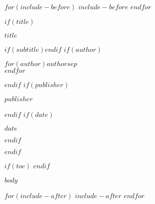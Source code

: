 \documentclass[
  $if(classoption)$$for(classoption)$$classoption$$sep$,$endfor$$else$oneside$endif$,
  $if(fontsize)$$fontsize$$else$11pt$endif$
]{scrbook}
\newcommand{\PrintTitle}{
  \begin{titlepage}
    \centering
    {\sffamily\bfseries\LARGE $title$ \par}
    $if(subtitle)$\vspace{6pt}{\sffamily\large $subtitle$ \par}$endif$
    \vspace{18pt}
    $if(author)$
      {\sffamily\normalsize $for(author)$$author$$sep$ \\ $endfor$ \par}
    $endif$
    \vspace{12pt}
    $if(publisher)$
      {\sffamily\small $publisher$ \par}
    $endif$
    \vfill
    $if(date)$
      {\sffamily\small $date$ \par}
    $endif$
  \end{titlepage}
}
\begin{document}
$for(include-before)$
$include-before$
$endfor$

\frontmatter
$if(title)$
\PrintTitle
$endif$

$if(toc)$
{\hypersetup{linkcolor=black}
\tableofcontents
\clearpage}
$endif$

\mainmatter

$body$

$for(include-after)$
$include-after$
$endfor$
\end{document}
